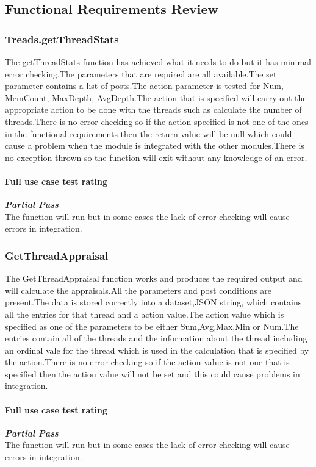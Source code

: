 \subsection{Functional Requirements Review}
\subsubsection{Treads.getThreadStats}
The getThreadStats function has achieved what it needs to do but it has minimal error checking.The parameters that are required are all available.The set parameter contains a list of posts.The action parameter is tested for Num, MemCount, MaxDepth, AvgDepth.The action that is specified will carry out the appropriate action to be done with the threads such as calculate the number of threads.There is no error checking so if the action specified is not one of the ones in the functional requirements then the return value will be null which could cause a problem when the module is integrated with the other modules.There is no exception thrown so the function will exit without any knowledge of an error.
\paragraph{\color{black} Full use case test rating\\}
\color{myOrange}
\textbf{\small \emph{Partial Pass}} \\
\color{black} The function will run but in some cases the lack of error checking will cause errors in integration.
\subsubsection{GetThreadAppraisal}
The GetThreadAppraisal function works and produces the required output and will calculate the appraisals.All the parameters and post conditions are present.The data is stored correctly into a dataset,JSON string, which contains all the entries for that thread and a action value.The action value which is specified as one of the parameters to be either Sum,Avg,Max,Min or Num.The entries contain all of the threads and the information about the thread including an ordinal vale for the thread which is used in the calculation that is specified by the action.There is no error checking so if the action value is not one that is specified then the action value will not be set and this could cause problems in integration.
\paragraph{\color{black} Full use case test rating\\}
\color{myOrange}
\textbf{\small \emph{Partial Pass}} \\
\color{black} The function will run but in some cases the lack of error checking will cause errors in integration.

